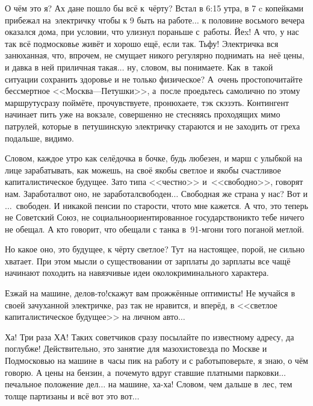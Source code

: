 О чём это я? Ах да\mdash не пошло бы всё к~чёрту? Встал в 6:15 утра, в 7 c копейками прибежал на~электричку чтобы к 9 быть на работе$\ldots$ к половине восьмого вечера оказался дома, при условии, что улизнул пораньше с~работы. Йеx! А что, у нас так всё подмосковье живёт и хорошо ещё, если так. Тьфу! Электричка вся занюханная, что, впрочем, не смущает никого регулярно поднимать на~неё цены, и давка в ней приличная такая$\ldots$ ну, словом, вы понимаете. Как~в~такой ситуации сохранить здоровье и не только физическое? А~очень просто\mdash почитайте бессмертное <<Москва\thinspace\nobreakdash---\thinspace Петушки>>\cite{МоскваПетушки}, а~после проедьтесь самолично по этому маршруту\mdash сразу поймёте, прочувствуете, пронюхаете, тэк скэзэть. Контингент начинает пить уже на вокзале, совершенно не стесняясь проходящих мимо патрулей, которые в~петушинскую электричку стараются и не заходить от греха подальше, видимо.

Словом, каждое утро как селёдочка в бочке, будь любезен, и марш с улыбкой на лице зарабатывать, как можешь, на своё якобы светлое и якобы счастливое капиталистическое будущее. Зато типа <<честно>> и~<<свободно>>, говорят нам. Заработал\mdash вот оно, не заработал\mdash свободен$\ldots$ Свободная же страна у нас? Вот и$\ldots$~свободен. И никакой пенсии по старости, что\sdash то мне кажется. А что, это теперь не Советский Союз, не социально\sdash ориентированное государство\mdash никто тебе ничего не обещал. А кто говорит, что обещали с танка в~91-м\mdash гони того поганой метлой.

Но какое оно, это будущее, к чёрту светлое? Тут~на настоящее, порой, не сильно хватает. 
При этом мысли о существовании от зарплаты до зарплаты все чащё начинают походить на навязчивые идеи околокриминального характера.

\diagdash Езжай на машине, делов-то!\mdash скажут вам прожжённые оптимисты! \mdash Не мучайся в своей зачуханной электричке, раз так не нравится, и вперёд, в <<светлое капиталистическое будущее>> на личном авто$\ldots$ 

Ха! Три раза ХА! Таких советчиков сразу посылайте по известному адресу, да поглубже! Действительно, это занятие для мазохистов\mdash езда по Москве и Подмосковью на машине в~часы пик на работу и с работы\mdash поверьте, я знаю, о чём говорю. А цены на бензин, а~почему\sdash то вдруг ставшие платными парковки$\ldots$ печальное положение дел$\ldots$ на машине, ха-ха! Словом, чем дальше в~лес, тем толще партизаны и всё вот это вот$\ldots$%

